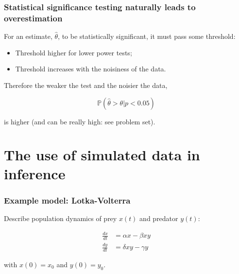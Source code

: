 \documentclass[handout]{beamer}
\begin{document}
\begin{frame}
	\frametitle{Statistical significance testing naturally leads to overestimation}
	
	For an estimate, $\hat{\theta}$, to be statistically significant, it must pass some threshold:
	
	\begin{itemize}
		\item Threshold higher for lower power tests;
		\item Threshold increases with the noisiness of the data.
	\end{itemize}
	
	Therefore the weaker the test and the noisier the data,
	
	\begin{equation}
	\mathbb{P}(\hat{\theta} > \theta|p < 0.05)
	\end{equation}
	
	is higher (and can be really high: see problem set).
	
\end{frame}

\section{The use of simulated data in inference}
\frame{\tableofcontents[currentsection]}

\begin{frame}
	\frametitle{Example model: Lotka-Volterra}
	
	Describe population dynamics of prey $x(t)$ and predator $y(t)$:
	
	\begin{align}
	\frac{dx}{dt} &= \alpha x - \beta x y\\
	\frac{dy}{dt} &= \delta x y - \gamma y
	\end{align}
	
	with $x(0)=x_0$ and $y(0)=y_0$.
	
\end{frame}
\end{document}
